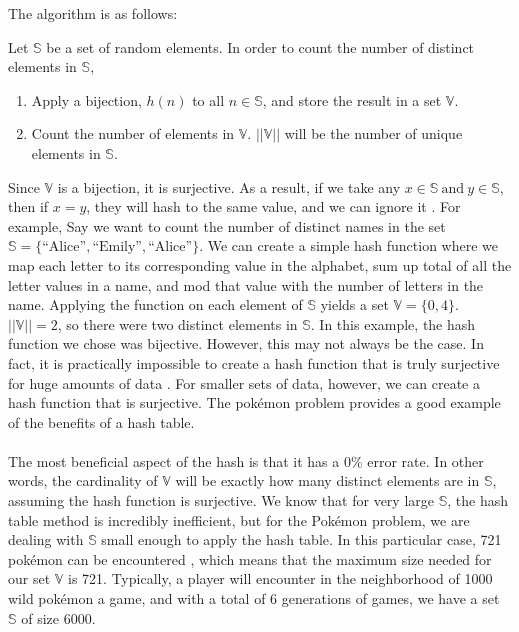 \documentclass{article}
\begin{document}
The algorithm is as follows:
\begin{center}
Let $\mathbb{S}$ be a set of random elements. In order to count the number of distinct elements in $\mathbb{S}$,
\begin{enumerate}
\item Apply a bijection, $h(n)$ to all $n\in\mathbb{S}$, and store the result in a set $\mathbb{V}$.
\item Count the number of elements in $\mathbb{V}$. $||\mathbb{V}||$ will be the number of unique elements in $\mathbb{S}$.
\end{enumerate}
\end{center}
Since $\mathbb{V}$ is a bijection, it is surjective. 
As a result, if we take any $x\in\mathbb{S}\ \text{and}\ y\in\mathbb{S}$, then if $x = y$, they will hash to the same value, and we can ignore it \cite[p. 6]{Maurer}. 
For example, Say we want to count the number of distinct names in the set $\mathbb{S} = \{\text{``Alice''},\text{``Emily''},\text{``Alice''}\}$. 
We can create a simple hash function where we map each letter to its corresponding value in the alphabet, sum up total of all the letter values in a name, and mod that value with the number of letters in the name. 
Applying the function on each element of $\mathbb{S}$ yields a set $\mathbb{V} = \{0,4\}$. $||\mathbb{V}|| = 2$, so there were two distinct elements in $\mathbb{S}$. In this example, the hash function we chose was bijective.
However, this may not always be the case. In fact, it is practically impossible to create a hash function that is truly surjective for huge amounts of data \cite[p. 6]{Maurer}. 
For smaller sets of data, however, we can create a hash function that is surjective. 
The pok\'emon problem provides a good example of the benefits of a hash table.
\\\\
\indent The most beneficial aspect of the hash is that it has a 0\% error rate. 
In other words, the cardinality of $\mathbb{V}$ will be exactly how many distinct elements are in $\mathbb{S}$, assuming the hash function is surjective. 
We know that for very large $\mathbb{S}$, the hash table method is incredibly inefficient, but for the Pok\'emon problem, we are dealing with $\mathbb{S}$ small enough to apply the hash table. 
In this particular case, 721 pok\'emon can be encountered \cite{Pokemon}, which means that the maximum size needed for our set $\mathbb{V}$ is 721. 
Typically, a player will encounter in the neighborhood of 1000 wild pok\'emon a game, and with a total of 6 generations of games, we have a set $\mathbb{S}$ of size 6000. 
\end{document}
